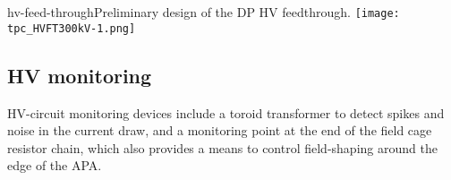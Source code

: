\begin{cdrfigure}[HV feedthrough]{hv-feed-through}{Preliminary design of the DP HV feedthrough.}
\texttt{[image: tpc\_HVFT300kV-1.png]}
\end{cdrfigure}




\subsection{HV monitoring}

HV-circuit monitoring devices include a toroid transformer to detect
spikes and noise in the current draw, and a monitoring point at the end
of the field cage resistor chain, which also provides a means to
control field-shaping around the edge of the
APA.

